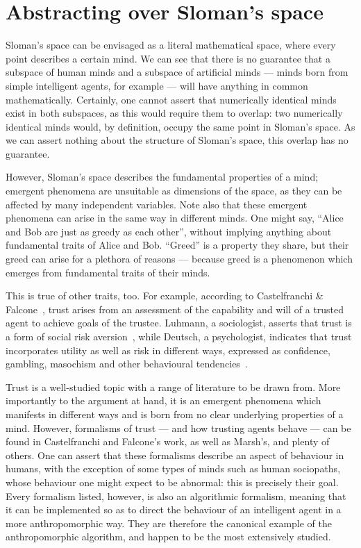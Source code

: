 \section{Abstracting over Sloman's space}

Sloman's space can be envisaged as a literal mathematical space, where every point describes a certain mind. We can see that there is no guarantee that a subspace of human minds and a subspace of artificial minds --- minds born from simple intelligent agents, for example --- will have anything in common mathematically. Certainly, one cannot assert that numerically identical minds exist in both subspaces, as this would require them to overlap: two numerically identical minds would, by definition, occupy the same point in Sloman's space. As we can assert nothing about the structure of Sloman's space, this overlap has no guarantee.\par

However, Sloman's space describes the fundamental properties of a mind; emergent phenomena are unsuitable as dimensions of the space, as they can be affected by many independent variables. Note also that these emergent phenomena can arise in the same way in different minds. One might say, ``Alice and Bob are just as greedy as each other'', without implying anything about fundamental traits of Alice and Bob. ``Greed'' is a property they share, but their greed can arise for a plethora of reasons --- because greed is a phenomenon which emerges from fundamental traits of their minds.\par

This is true of other traits, too. For example, according to Castelfranchi \& Falcone~\citep{CastelfranchiSocialApproach}, trust arises from an assessment of the capability and will of a trusted agent to achieve goals of the trustee. Luhmann, a sociologist, asserts that trust is a form of social risk aversion~\citep{luhmann2000familiarity}, while Deutsch, a psychologist, indicates that trust incorporates utility as well as risk in different ways, expressed as confidence, gambling, masochism and other behavioural tendencies~\citep{deutsch1962cooperation}.\par

Trust is a well-studied topic with a range of literature to be drawn from. More importantly to the argument at hand, it is an emergent phenomena which manifests in different ways and is born from no clear underlying properties of a mind. However, formalisms of trust --- and how trusting agents behave --- can be found in Castelfranchi and Falcone's work, as well as Marsh's, and plenty of others. One can assert that these formalisms describe an aspect of behaviour in humans, with the exception of some types of minds such as human sociopaths, whose behaviour one might expect to be abnormal: this is precisely their goal. Every formalism listed, however, is also an algorithmic formalism, meaning that it can be implemented so as to direct the behaviour of an intelligent agent in a more anthropomorphic way. They are therefore the canonical example of the anthropomorphic algorithm, and happen to be the most extensively studied.\par


